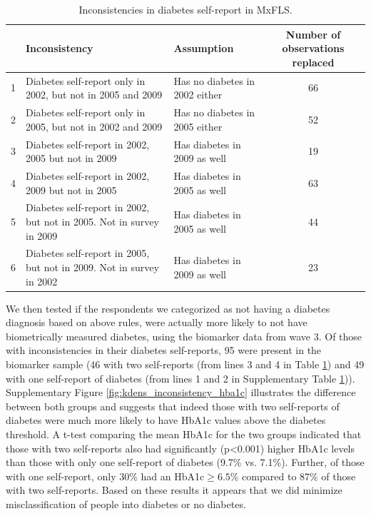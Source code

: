 \documentclass[12pt,english]{article}
\providecommand{\tabularnewline}{\\}
\begin{document}
\begin{table}[!ht]
	\caption{\label{tab:Inconsistencies}Inconsistencies in diabetes self-report in MxFLS.}
	\begin{center}
		\begin{adjustbox}{max width=\linewidth} 
			\begin{tabular}{lllc}
				\hline 
				&Inconsistency  & Assumption  & Number of observations replaced\tabularnewline
				\hline 
				1 &Diabetes self-report only in 2002, but not in 2005 and 2009  & Has no diabetes in 2002 either  & 66\tabularnewline
				2 &Diabetes self-report only in 2005, but not in 2002 and 2009  & Has no diabetes in 2005 either  & 52\tabularnewline
				3 &Diabetes self-report in 2002, 2005 but not in 2009  & Has diabetes in 2009 as well  & 19\tabularnewline
				4 &Diabetes self-report in 2002, 2009 but not in 2005  & Has diabetes in 2005 as well  & 63\tabularnewline
				5 &Diabetes self-report in 2002, but not in 2005. Not in survey in 2009  & Has diabetes in 2005 as well  & 44\tabularnewline
				6 &Diabetes self-report in 2005, but not in 2009. Not in survey in 2002  & Has diabetes in 2009 as well  & 23\tabularnewline
				\hline 
			\end{tabular}
		\end{adjustbox}
	\end{center}
\end{table}

We then tested if the respondents we categorized as not having a diabetes diagnosis based on above rules, were actually more likely to not have biometrically measured diabetes, using the biomarker data from wave 3. Of those with inconsistencies in their diabetes self-reports, 95 were present in the biomarker sample (46 with two self-reports (from lines 3 and 4 in Table \ref{tab:Inconsistencies}) and 49 with one self-report of diabetes (from lines 1 and 2 in Supplementary Table \ref{tab:Inconsistencies})). Supplementary Figure \ref{fig:kdens_inconsistency_hba1c} illustrates the difference between both groups and suggests that indeed those with two self-reports of diabetes were much more likely to have \ac{HbA1c} values above the diabetes threshold. A t-test comparing the mean \ac{HbA1c} for the two groups indicated that those with two self-reports also had significantly (p<0.001) higher \ac{HbA1c} levels than those with only one self-report of diabetes (9.7\% vs. 7.1\%). Further, of those with one self-report,  only 30\% had an \ac{HbA1c}$\geq6.5$\% compared to 87\% of those with two self-reports. Based on these results it appears that we did minimize misclassification of people into diabetes or no diabetes. 
\end{document}
